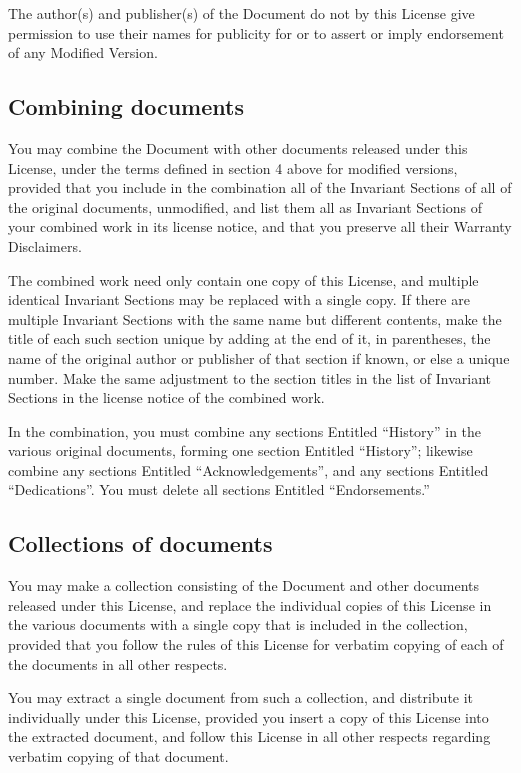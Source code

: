 The author(s) and publisher(s) of the Document do not by this License
give permission to use their names for publicity for or to assert
or imply endorsement of any Modified Version.

\subsection{Combining documents}

You may combine the Document with other documents released under this
License, under the terms defined in section 4 above for modified versions,
provided that you include in the combination all of the Invariant
Sections of all of the original documents, unmodified, and list them
all as Invariant Sections of your combined work in its license notice,
and that you preserve all their Warranty Disclaimers.

The combined work need only contain one copy of this License, and
multiple identical Invariant Sections may be replaced with a single
copy. If there are multiple Invariant Sections with the same name
but different contents, make the title of each such section unique
by adding at the end of it, in parentheses, the name of the original
author or publisher of that section if known, or else a unique number.
Make the same adjustment to the section titles in the list of Invariant
Sections in the license notice of the combined work.

In the combination, you must combine any sections Entitled ``History''
in the various original documents, forming one section Entitled ``History'';
likewise combine any sections Entitled ``Acknowledgements'', and any
sections Entitled ``Dedications''. You must delete all sections Entitled
``Endorsements.''

\subsection{Collections of documents}

You may make a collection consisting of the Document and other documents
released under this License, and replace the individual copies of
this License in the various documents with a single copy that is included
in the collection, provided that you follow the rules of this License
for verbatim copying of each of the documents in all other respects.

You may extract a single document from such a collection, and distribute
it individually under this License, provided you insert a copy of
this License into the extracted document, and follow this License
in all other respects regarding verbatim copying of that document.


